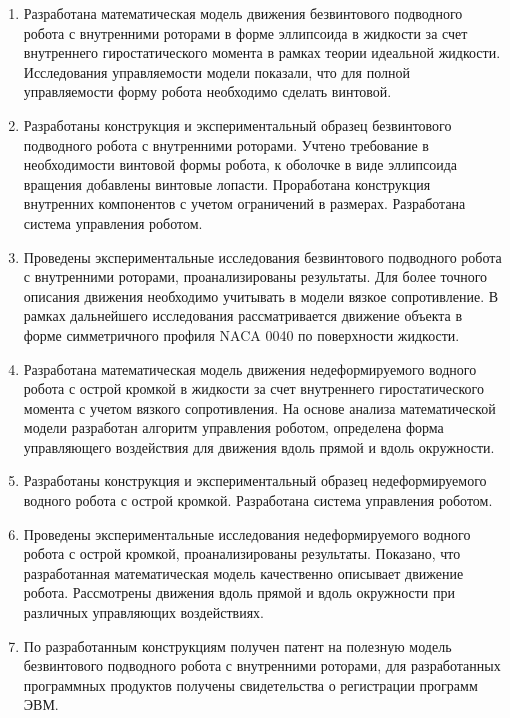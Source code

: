\begin{enumerate}
  \item Разработана математическая модель движения безвинтового подводного робота с внутренними роторами в форме эллипсоида в жидкости за счет внутреннего гиростатического момента в рамках теории идеальной жидкости. Исследования управляемости модели показали, что для полной управляемости форму робота необходимо сделать винтовой.
  
  \item Разработаны конструкция и экспериментальный образец безвинтового подводного робота с внутренними роторами. Учтено требование в необходимости винтовой формы робота, к оболочке в виде эллипсоида вращения добавлены винтовые лопасти. Проработана конструкция внутренних компонентов с учетом ограничений в размерах. Разработана система управления роботом.
  
  \item Проведены экспериментальные исследования безвинтового подводного робота с внутренними роторами, проанализированы результаты. Для более точного описания движения необходимо учитывать в модели вязкое сопротивление. В рамках  дальнейшего исследования рассматривается движение объекта в форме симметричного профиля NACA 0040 по поверхности жидкости.
  
  \item Разработана математическая модель движения недеформируемого водного робота с острой кромкой в жидкости за счет внутреннего гиростатического момента с учетом вязкого сопротивления. На основе анализа математической модели разработан алгоритм управления роботом, определена форма управляющего воздействия для движения вдоль прямой и вдоль окружности.
  
  \item Разработаны конструкция и экспериментальный образец недеформируемого водного робота с острой кромкой. Разработана система управления роботом.
  
  \item Проведены экспериментальные исследования недеформируемого водного робота с острой кромкой, проанализированы результаты. Показано, что разработанная математическая модель качественно описывает движение робота. Рассмотрены движения вдоль прямой и вдоль окружности при различных управляющих воздействиях.
  
  \item По разработанным конструкциям получен патент на полезную модель безвинтового подводного робота с внутренними роторами, для разработанных программных продуктов получены свидетельства о регистрации программ ЭВМ.
\end{enumerate}
